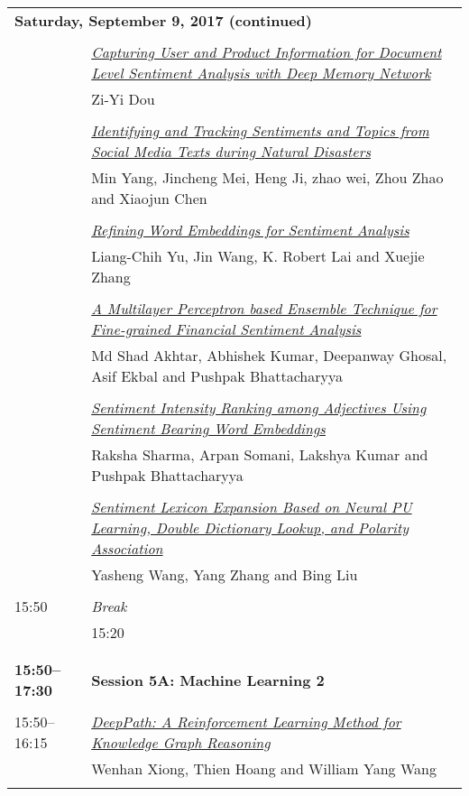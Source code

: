 \begin{tabular}{p{20mm}p{128mm}}
\\
\multicolumn{2}{l}{\bf Saturday, September 9, 2017 (continued)} \\\\
 & \hyperlink{page.530}{\em Capturing User and Product Information for Document Level Sentiment Analysis with Deep Memory Network}\\
         & Zi-Yi Dou \\
\\

 & \hyperlink{page.536}{\em Identifying and Tracking Sentiments and Topics from Social Media Texts during Natural Disasters}\\
         & Min Yang, Jincheng Mei, Heng Ji, zhao wei, Zhou Zhao and Xiaojun Chen \\
\\

 & \hyperlink{page.543}{\em Refining Word Embeddings for Sentiment Analysis}\\
         & Liang-Chih Yu, Jin Wang, K. Robert Lai and Xuejie Zhang \\
\\

 & \hyperlink{page.549}{\em A Multilayer Perceptron based Ensemble Technique for Fine-grained Financial Sentiment Analysis}\\
         & Md Shad Akhtar, Abhishek Kumar, Deepanway Ghosal, Asif Ekbal and Pushpak Bhattacharyya \\
\\

 & \hyperlink{page.556}{\em Sentiment Intensity Ranking among Adjectives Using Sentiment Bearing Word Embeddings}\\
         & Raksha Sharma, Arpan Somani, Lakshya Kumar and Pushpak Bhattacharyya \\
\\

 & \hyperlink{page.562}{\em Sentiment Lexicon Expansion Based on Neural PU Learning, Double Dictionary Lookup, and Polarity Association}\\
         & Yasheng Wang, Yang Zhang and Bing Liu \\
\\

15:50 & {\em Break}\\
         & 15:20\\
\\
\\{\bf 15:50--17:30} & {\bf Session 5A: Machine Learning 2 } \\
\\
15:50--16:15 & \hyperlink{page.573}{\em DeepPath: A Reinforcement Learning Method for Knowledge Graph Reasoning}\\
         & Wenhan Xiong, Thien Hoang and William Yang Wang \\
\\


\end{tabular}
